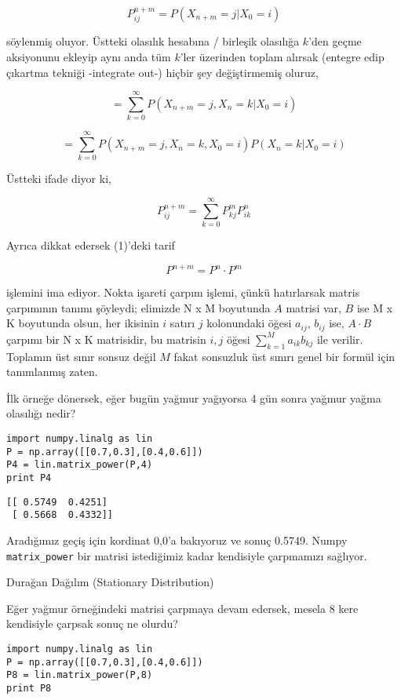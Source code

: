 \documentclass[12pt,fleqn]{article}\usepackage{../../common}
\begin{document}
$$
P_{ij}^{n+m} = P(X_{n+m} = j | X_0 = i )
$$

söylenmiş oluyor. Üstteki olasılık hesabına / birleşik olasılığa $k$'den geçme
aksiyonunu ekleyip aynı anda tüm $k$'ler üzerinden toplam alırsak (entegre edip
çıkartma tekniği -integrate out-) hiçbir şey değiştirmemiş oluruz,

$$
= \sum_{k=0}^{\infty} P(X_{n+m} = j, X_n = k | X_0 = i )
$$

$$
= \sum_{k=0}^{\infty} P(X_{n+m} = j, X_n = k, X_0 = i )
P(X_n=k|X_0=i)
$$

Üstteki ifade diyor ki,

$$
P_{ij}^{n+m} = \sum _{k=0}^{\infty} P_{kj}^m P_{ik}^n 
$$

Ayrıca dikkat edersek (1)'deki tarif

$$
P^{n+m} = P^n \cdot P^m
$$

işlemini ima ediyor. Nokta işareti çarpım işlemi, çünkü hatırlarsak matris
çarpımının tanımı şöyleydi; elimizde N x M boyutunda $A$ matrisi var, $B$ ise M
x K boyutunda olsun, her ikisinin $i$ satırı $j$ kolonundaki öğesi $a_{ij}$,
$b_{ij}$ ise, $A \cdot B$ çarpımı bir N x K matrisidir, bu matrisin $i,j$ öğesi
$\sum_{k=1}^{M} a_{ik}b_{kj}$ ile verilir. Toplamın üst sınır sonsuz değil
$M$ fakat sonsuzluk üst sınırı genel bir formül için tanımlanmış zaten.


İlk örneğe dönersek, eğer bugün yağmur yağıyorsa 4 gün sonra yağmur yağma
olasılığı nedir?

\begin{verbatim}
import numpy.linalg as lin
P = np.array([[0.7,0.3],[0.4,0.6]])
P4 = lin.matrix_power(P,4)
print P4
\end{verbatim}

\begin{verbatim}
[[ 0.5749  0.4251]
 [ 0.5668  0.4332]]
\end{verbatim}

Aradığımız geçiş için kordinat 0,0'a bakıyoruz ve sonuç 0.5749. Numpy
\verb!matrix_power! bir matrisi istediğimiz kadar kendisiyle çarpmamızı
sağlıyor. 

Durağan Dağılım (Stationary Distribution)

Eğer yağmur örneğindeki matrisi çarpmaya devam edersek, mesela 8 kere
kendisiyle çarpsak sonuç ne olurdu? 

\begin{verbatim}
import numpy.linalg as lin
P = np.array([[0.7,0.3],[0.4,0.6]])
P8 = lin.matrix_power(P,8)
print P8
\end{verbatim}
\end{document}
